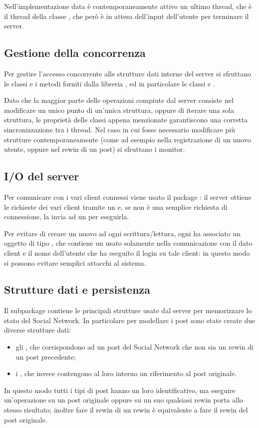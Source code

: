 \documentclass[
    oneside,
    10pt,
    language=italian,
    a4paper,
    article
]{notes}
\begin{document}
Nell'implementazione data è contemporaneamente attivo un ultimo thread, che è
il thread della classe , che però è in attesa dell'input
dell'utente per terminare il server.

\subsection{Gestione della concorrenza}
Per gestire l'accesso concorrente alle strutture dati interne del server si
sfruttano le classi e i metodi forniti dalla libreria ,
ed in particolare le classi  e .

Dato che la maggior parte delle operazioni compiute dal server consiste nel 
modificare un unico punto di un'unica struttura, oppure di iterare una sola
struttura, le proprietà delle classi appena menzionate garantiscono una corretta
sincronizzazione tra i thread.
Nel caso in cui fosse necessario modificare più strutture contemporaneamente
(come ad esempio nella registrazione di un nuovo utente, oppure nel rewin di un
post) si sfruttano i monitor.

\subsection{I/O del server}
Per comunicare con i vari client connessi viene usato il package :
il server ottiene le richieste dei vari client tramite un  e,
se non è una semplice richiesta di connessione, la invia ad un 
per eseguirla.

Per evitare di creare un nuovo  ad ogni scrittura/lettura,
ogni  ha associato un oggetto di tipo ,
che contiene un  usato solamente nella comunicazione con il
dato client e il nome dell'utente che ha eseguito il login su tale client:
in questo modo si possono evitare semplici attacchi al sistema.

\subsection{Strutture dati e persistenza}
Il subpackage  contiene le principali strutture
usate dal server per memorizzare lo stato del Social Network. In particolare per
modellare i post sono state create due diverse strutture dati: \begin{itemize}
    \item gli , che corrispondono ad un post del 
        Social Network che non sia un rewin di un post precedente;
    \item i , che invece contengono al loro interno un riferimento
        al post originale.
\end{itemize} In questo modo tutti i tipi di post hanno un loro identificativo,
ma eseguire un'operazione su un post originale oppure su un suo qualsiasi rewin
porta allo stesso risultato; inoltre fare il rewin di un rewin è equivalente a 
fare il rewin del post originale.
\end{document}
